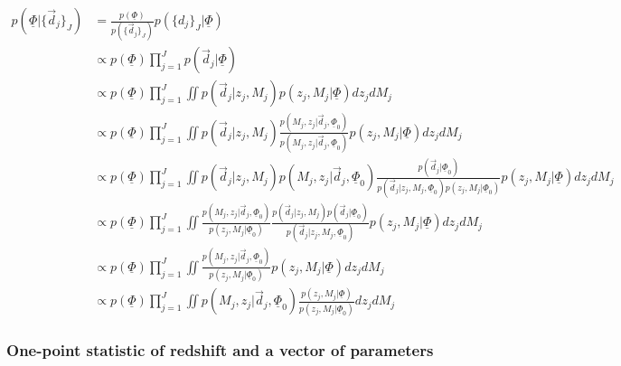 \documentclass[12pt, onecolumn]{emulateapj}
\newcommand{\textul}{\underline}
\begin{document}
\begin{align*}
p(\textul{\Phi}|\{\vec{d}_{j}\}_{J}) &= \frac{p(\textul{\Phi})}{p(\{\vec{d}_{j}\}_{J})}p(\{d_{j}\}_{J}|\textul{\Phi})\\
&\propto p(\textul{\Phi})\prod_{j=1}^{J}p(\vec{d}_{j}|\textul{\Phi})\\
&\propto p(\textul{\Phi})\prod_{j=1}^{J}\iint p(\vec{d}_{j}|z_{j},M_{j})p(z_{j},M_{j}|\textul{\Phi})dz_{j}dM_{j}\\
&\propto p(\textul{\Phi})\prod_{j=1}^{J}\iint p(\vec{d}_{j}|z_{j},M_{j})\frac{p(M_{j},z_{j}|\vec{d}_{j},\textul{\Phi}_{0})}{p(M_{j},z_{j}|\vec{d}_{j},\textul{\Phi}_{0})}p(z_{j},M_{j}|\textul{\Phi})dz_{j}dM_{j}\\
&\propto p(\textul{\Phi})\prod_{j=1}^{J}\iint p(\vec{d}_{j}|z_{j},M_{j})p(M_{j},z_{j}|\vec{d}_{j},\textul{\Phi}_{0})\frac{p(\vec{d}_{j}|\textul{\Phi}_{0})}{p(\vec{d}_{j}|z_{j},M_{j},\textul{\Phi}_{0})p(z_{j},M_{j}|\textul{\Phi}_{0})}p(z_{j},M_{j}|\textul{\Phi})dz_{j}dM_{j}\\
&\propto p(\textul{\Phi})\prod_{j=1}^{J}\iint \frac{p(M_{j},z_{j}|\vec{d}_{j},\textul{\Phi}_{0})}{p(z_{j},M_{j}|\textul{\Phi}_{0})}\frac{p(\vec{d}_{j}|z_{j},M_{j})p(\vec{d}_{j}|\textul{\Phi}_{0})}{p(\vec{d}_{j}|z_{j},M_{j},\textul{\Phi}_{0})}p(z_{j},M_{j}|\textul{\Phi})dz_{j}dM_{j}\\
&\propto p(\textul{\Phi})\prod_{j=1}^{J}\iint \frac{p(M_{j},z_{j}|\vec{d}_{j},\textul{\Phi}_{0})}{p(z_{j},M_{j}|\textul{\Phi}_{0})}p(z_{j},M_{j}|\textul{\Phi})dz_{j}dM_{j}\\
&\propto p(\textul{\Phi})\prod_{j=1}^{J}\iint p(M_{j},z_{j}|\vec{d}_{j},\textul{\Phi}_{0})\frac{p(z_{j},M_{j}|\textul{\Phi})}{p(z_{j},M_{j}|\textul{\Phi}_{0})}dz_{j}dM_{j}
\end{align*}

\subsubsection{One-point statistic of redshift and a vector of parameters}
\end{document}
